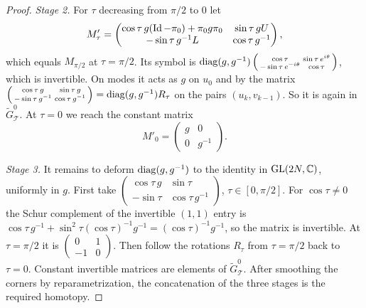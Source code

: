\begin{proof}
  \emph{Stage 2.} For $\tau$ decreasing from $\pi/2$ to $0$ let
  \begin{equation*}
    M'_\tau=\begin{pmatrix}\cos\tau\,g(\operatorname{Id}-\pi_0)+\pi_0g\pi_0&\sin\tau\,gU\\
    -\sin\tau\,g^{-1}L&\cos\tau\,g^{-1}\end{pmatrix},
  \end{equation*}
  which equals $M_{\pi/2}$ at $\tau=\pi/2$. Its symbol is
  $\operatorname{diag}(g,g^{-1})\left(\begin{smallmatrix}\cos\tau&\sin\tau\,e^{i\theta}\\
  -\sin\tau\,e^{-i\theta}&\cos\tau\end{smallmatrix}\right)$, which is
  invertible. On modes it acts as $g$ on $u_0$ and by the matrix
  $\left(\begin{smallmatrix}\cos\tau\,g&\sin\tau\,g\\-\sin\tau\,g^{-1}&
  \cos\tau\,g^{-1}\end{smallmatrix}\right)=\operatorname{diag}(g,g^{-1})R_\tau$ on the pairs
  $(u_k,v_{k-1})$. So it is again in $\tilde G^0_{\mathcal T}$. At $\tau=0$
  we reach the constant matrix
  \begin{equation*}
    M'_0=\begin{pmatrix}g&0\\0&g^{-1}\end{pmatrix}.
  \end{equation*}

  \emph{Stage 3.} It remains to deform $\operatorname{diag}(g,g^{-1})$ to the identity in
  $\operatorname{GL}(2N,\mathbb{C})$, uniformly in $g$. First take
  $\left(\begin{smallmatrix}\cos\tau\,g&\sin\tau\\-\sin\tau&\cos\tau\,g^{-1}
  \end{smallmatrix}\right)$, $\tau\in[0,\pi/2]$. For $\cos\tau\ne0$ the Schur
  complement of the invertible $(1,1)$ entry is
  $\cos\tau\,g^{-1}+\sin^2\tau(\cos\tau)^{-1}g^{-1}=(\cos\tau)^{-1}g^{-1}$, so
  the matrix is invertible. At $\tau=\pi/2$ it is
  $\left(\begin{smallmatrix}0&1\\-1&0\end{smallmatrix}\right)$. Then follow
  the rotations $R_\tau$ from $\tau=\pi/2$ back to $\tau=0$. Constant
  invertible matrices are elements of $\tilde G^0_{\mathcal T}$. After
  smoothing the corners by reparametrization, the concatenation of the three
  stages is the required homotopy.
\end{proof}

